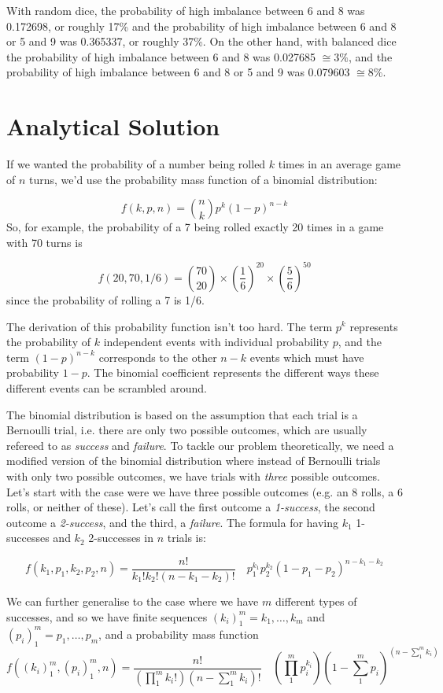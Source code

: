 \documentclass[11pt]{article}
\begin{document}
With random dice, the probability of high imbalance between 6 and 8 was 0.172698, or roughly 17\% and the probability of high imbalance between 6 and 8 or 5 and 9 was 0.365337, or roughly 37\%. On the other hand, with balanced dice the probability of high imbalance between 6 and 8 was 0.027685 $\cong 3\%$, and the probability of high imbalance between 6 and 8 or 5 and 9 was 0.079603 $\cong 8\% .$


\section{Analytical Solution}
If we wanted the probability of a number being rolled $k$ times in an average game of $n$ turns, we'd use the probability mass function of a binomial distribution:

$$
f(k, p, n) = \binom{n}{k}p^k(1-p)^{n-k}
$$
So, for example, the probability of a 7 being rolled exactly 20 times in a game with 70 turns is

$$
f(20, 70, 1/6) = \binom{70}{20} \times \left(\frac{1}{6}\right)^{20} \times \left(\frac{5}{6}\right)^{50}
$$
since the probability of rolling a 7 is 1/6.

The derivation of this probability function isn't too hard. The term $p^k$ represents the probability of $k$ independent events with individual probability $p$, and the term $(1-p)^{n-k}$ corresponds to the other $n-k$ events which must have probability $1-p$. The binomial coefficient represents the different ways these different events can be scrambled around.

The binomial distribution is based on the assumption that each trial is a Bernoulli trial, i.e. there are only two possible outcomes, which are usually refereed to as \emph{success} and \emph{failure}. To tackle our problem theoretically, we need a modified version of the binomial distribution where instead of Bernoulli trials with only two possible outcomes, we have trials with \emph{three} possible outcomes. Let's start with the case were we have three possible outcomes (e.g. an 8 rolls, a 6 rolls, or neither of these). Let's call the first outcome a \emph{1-success}, the second outcome a \emph{2-success}, and the third, a \emph{failure}. The formula for having $k_1$ 1-successes and $k_2$ 2-successes in $n$ trials is:

$$
f(k_1, p_1, k_2, p_2, n) = \frac{n!}{k_1! k_2! (n- k_1 - k_2)!} \quad p_1^{k_1} p_2^{k_2} (1 - p_1 - p_2)^{n - k_1 - k_2}
$$

We can further generalise to the case where we have $m$ different types of successes, and so we have finite sequences $(k_i)_1^m = k_1, \ldots, k_m$ and $(p_i)_1^m = p_1, \ldots, p_m$, and a probability mass function
$$
f((k_i)_1^m, (p_i)_1^m, n) = \frac{n!}{(\prod_1^m k_i!) (n- \sum_1^m k_i)!} \quad \left(\prod_1^m p_i^{k_i}\right)\left(1 - \sum_1^m p_i\right)^{\left(n - \sum_1^m k_i\right)}
$$
\end{document}
